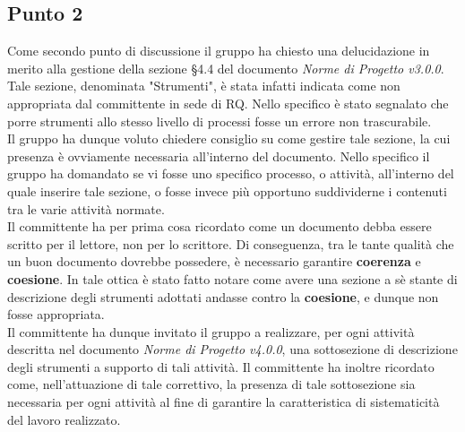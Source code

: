 \subsection{Punto 2}
Come secondo punto di discussione il gruppo ha chiesto una delucidazione in merito alla gestione della sezione §4.4 del documento \textit{Norme di Progetto v3.0.0}. Tale sezione, denominata "Strumenti", è stata infatti indicata come non appropriata dal committente in sede di RQ. Nello specifico è stato segnalato che porre strumenti allo stesso livello di processi fosse un errore non trascurabile.\\
Il gruppo ha dunque voluto chiedere consiglio su come gestire tale sezione, la cui presenza è ovviamente necessaria all'interno del documento. Nello specifico il gruppo ha domandato se vi fosse uno specifico processo, o attività, all'interno del quale inserire tale sezione, o fosse invece più opportuno suddividerne i contenuti tra le varie attività normate.\\
Il committente ha per prima cosa ricordato come un documento debba essere scritto per il lettore, non per lo scrittore. Di conseguenza, tra le tante qualità che un buon documento dovrebbe possedere, è necessario garantire \textbf{coerenza} e \textbf{coesione}. In tale ottica è stato fatto notare come avere una sezione a sè stante di descrizione degli strumenti adottati andasse contro la \textbf{coesione}, e dunque non fosse appropriata.\\
Il committente ha dunque invitato il gruppo a realizzare, per ogni attività descritta nel documento \textit{Norme di Progetto v4.0.0}, una sottosezione di descrizione degli strumenti a supporto di tali attività. Il committente ha inoltre ricordato come, nell'attuazione di tale correttivo, la presenza di tale sottosezione sia necessaria per ogni attività al fine di garantire la caratteristica di sistematicità del lavoro realizzato.


